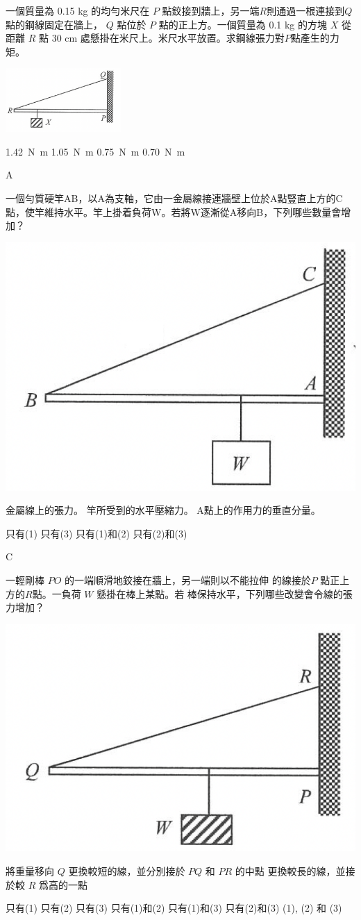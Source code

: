 {
一個質量為 0.15 kg 的均勻米尺在 $P$ 點鉸接到牆上，另一端$R$則通過一根連接到$Q$點的鋼線固定在牆上， $Q$ 點位於 $P$ 點的正上方。一個質量為 0.1 kg 的方塊 $X$ 從距離 $R$ 點 30 cm 處懸掛在米尺上。米尺水平放置。求鋼線張力對$P$點產生的力矩。
{\par\centering
\includegraphics[width=0.33\textwidth]{assets/84e42251.png}
\par}
\begin{tasks}
    \task \qty{1.42}{N.m}
    \task \qty{1.05}{N.m}
    \task \qty{0.75}{N.m}
    \task \qty{0.70}{N.m}
\end{tasks}
}{A}

{
一個勻質硬竿AB，以A為支軸，它由一金屬線接連牆壁上位於A點豎直上方的C點，使竿維持水平。竿上掛着負荷W。若將W逐漸從A移向B，下列哪些數量會增加？
{\par\centering
\includegraphics[width=.3\textwidth]{assets/a9b14a8d.png}
\par}
\begin{statements}
    \task 金屬線上的張力。
    \task 竿所受到的水平壓縮力。
    \task A點上的作用力的垂直分量。
\end{statements}
\begin{tasks}
    \task 只有(1)
    \task 只有(3)
    \task 只有(1)和(2)
    \task 只有(2)和(3)
\end{tasks}
}{C}

{
一輕剛棒 $PO$ 的一端順滑地鉸接在牆上，另一端則以不能拉伸 的線接於$P$ 點正上方的$R$點。一負荷 $W$ 懸掛在棒上某點。若 棒保持水平，下列哪些改變會令線的張力增加？
{\par\centering
\includegraphics[width=.3\textwidth]{assets/4f96447b.png}
\par}
\begin{statements}
    \task
    將重量移向 $Q$
    \task
    更換較短的線，並分別接於 $PQ$ 和 $PR$ 的中點
    \task
    更換較長的線，並接於較 $R$ 爲高的一點
\end{statements}
\begin{tasks}
    \task 只有(1)
    \task 只有(2)
    \task 只有(3)
    \task 只有(1)和(2)
    \task 只有(1)和(3)
    \task 只有(2)和(3)
    \task (1), (2) 和 (3)
\end{tasks}
}{}

